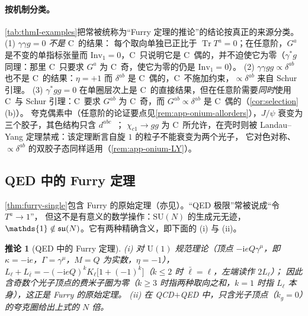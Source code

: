 \documentclass[UTF8,a4paper,11pt,fontset=fandol]{ctexart}
\let\amsmathbb\mathbb
\renewcommand{\mathbb}[1]{\ifx1#1\mathds{1}\else\amsmathbb{#1}\fi}
\theoremstyle{cplain}
\newtheorem{corollary}[theorem]{推论}
\theoremstyle{cdefinition}
\theoremstyle{cremark}
\numberwithin{equation}{section}
\DeclareMathOperator{\Tr}{Tr}
\newcommand{\su}{\mathfrak{su}}
\newcommand{\ii}{\mathrm{i}}                        %
\begin{document}
\paragraph{按机制分类。}\cref{tab:thmI-examples}把常被统称为“Furry 定理的推论”的结论按真正的来源分类。(1) $\gamma\gamma g=0$ \emph{不是} C~的结果：
每个取向单独已正比于 $\Tr T^a=0$；在任意阶，$G^a$ 是不变的单指标张量而 $\mathrm{Inv}_1=0$，C~只说明它是 C~偶的，并不迫使它为零（$\gamma^*g$ 同理：那里 C~只要求 $G^a$ 为 C~奇，使它为零的仍是 $\mathrm{Inv}_1=0$）。
(2) $\gamma\gamma gg\propto\delta^{ab}$ 也不是 C~的结果：$\eta=+1$ 而 $\delta^{ab}$ 是 C~偶的，C~不施加约束，$\propto\delta^{ab}$ 来自 Schur 引理。
(3) $\gamma^*gg=0$ 在单圈层次上是 C~的直接结果，但在任意阶需要\emph{同时}使用 C~与 Schur 引理：C~要求 $G^{ab}$ 为 C~奇，而 $G^{ab}\propto\delta^{ab}$ 是 C~偶的（\cref{cor:selection}(b)）。
夸克偶素中（任意阶的论证要点见\cref{rem:app-onium-allorders}），$J/\psi$ 衰变为三个胶子\cite{AppelquistPolitzer1975PRL}，其色结构只含 $d^{abc}$~\cite{Ewerz2003,Jia2007}；
$\chi_{c1}\to gg$ 为 C~所允许，在壳时则被 Landau--Yang 定理\cite{Landau1948,Yang1950}禁戒：该定理断言自旋 $1$ 的粒子不能衰变为两个光子，
它对色对称、$\propto\delta^{ab}$ 的双胶子态同样适用（\cref{rem:app-onium-LY}）。

\subsection{QED 中的 Furry 定理}\label{sec:thmI-qed}

\cref{thm:furry-single}包含 Furry 的原始定理\cite{Furry1937}（亦见\cite[第~10.1~节]{PeskinSchroeder1995}）。“QED 极限”常被说成“令 $T^a\to1$”，
但这不是有意义的数学操作：$\mathrm{SU}(N)$ 的生成元无迹，$\mathbb 1\notin\su(N)$。它有两种精确含义，即下面的 (i) 与 (ii)。

\begin{corollary}[QED 中的 Furry 定理]\label{cor:qed}
(i) 对 $\mathrm U(1)$ 规范理论（顶点 $-\ii eQ\gamma^\mu$，即 $\kappa=-\ii e$，$\Gamma=\gamma^\mu$，$M=Q$ 为实数，$\eta=-1$），
$L_\ell+L_{\bar\ell}=-(-\ii eQ)^kK_\ell\bigl[1+(-1)^k\bigr]$（$k\le2$ 时 $\bar\ell=\ell$，左端读作 $2L_\ell$）；
因此含奇数个光子顶点的费米子圈为零（$k\ge3$ 时指两种取向之和，$k=1$ 时指 $L_\ell$ 本身），这正是 Furry 的原始定理。
(ii) 在 QCD$+$QED 中，只含光子顶点（$k_g=0$）的夸克圈给出上式的 $N$ 倍。
\end{corollary}
\end{document}
